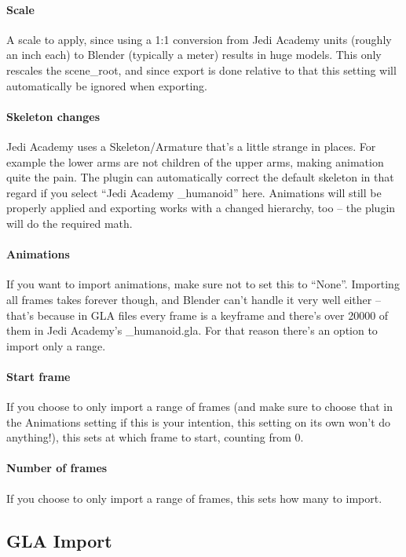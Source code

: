 \documentclass[a4paper,10pt]{article}
\begin{document}
 \paragraph*{Scale}
 A scale to apply, since using a 1:1 conversion from Jedi Academy units (roughly an inch each) to Blender
 (typically a meter) results in huge models. This only rescales the scene\_root, and since export is done
 relative to that this setting will automatically be ignored when exporting.
 
 \paragraph*{Skeleton changes}
 Jedi Academy uses a Skeleton/Armature that's a little strange in places. For example the lower arms are not
 children of the upper arms, making animation quite the pain. The plugin can automatically correct the
 default skeleton in that regard if you select ``Jedi Academy \_humanoid'' here. Animations will still be
 properly applied and exporting works with a changed hierarchy, too -- the plugin will do the required math.
 
 \paragraph*{Animations}
 If you want to import animations, make sure not to set this to ``None''. Importing all frames takes forever
 though, and Blender can't handle it very well either -- that's because in GLA files every frame is a keyframe
 and there's over 20000 of them in Jedi Academy's \_humanoid.gla. For that reason there's an option to import
 only a range.
 
 \paragraph*{Start frame}
 If you choose to only import a range of frames (and make sure to choose that in the Animations setting if
 this is your intention, this setting on its own won't do anything!), this sets at which frame to start, 
 counting from 0.
 
 \paragraph*{Number of frames}
 If you choose to only import a range of frames, this sets how many to import.
 
 
 \subsection{GLA Import}
 
\end{document}
